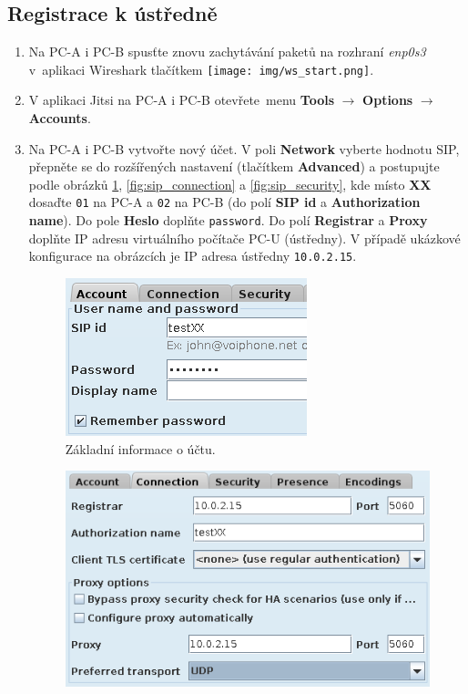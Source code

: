 \subsection{Registrace k ústředně}
\begin{enumerate}
    \item Na PC-A i PC-B spusťte znovu zachytávání paketů na rozhraní \emph{enp0s3} v aplikaci Wireshark tlačítkem \texttt{[image: img/ws\_start.png]}.
    \item V aplikaci Jitsi na PC-A i PC-B otevřete menu {\bf Tools} $\rightarrow$ {\bf Options} $\rightarrow$ {\bf Accounts}.
    \item Na PC-A i PC-B vytvořte nový účet. V poli {\bf Network} vyberte hodnotu SIP, přepněte se do rozšířených nastavení (tlačítkem {\bf Advanced}) a postupujte podle obrázků \ref{fig:sip_account}, \ref{fig:sip_connection} a \ref{fig:sip_security}, kde místo {\bf XX} dosaďte \texttt{01} na PC-A a \texttt{02} na PC-B (do polí \textbf{SIP id} a \textbf{Authorization name}).
	Do pole \textbf{Heslo} doplňte \texttt{password}. Do polí \textbf{Registrar} a \textbf{Proxy} doplňte IP adresu virtuálního počítače PC-U (ústředny). V případě ukázkové konfigurace na obrázcích je IP adresa ústředny \texttt{10.0.2.15}.\\
\begin{figure}[H]
  \centering
  \includegraphics[scale=1]{img/sip_account.png}
  \caption{Základní informace o účtu.}
  \label{fig:sip_account}
\end{figure}
\begin{figure}[H]
  \centering
  \includegraphics[scale=1]{img/sip_connection.png}

\end{figure}
\end{enumerate}
